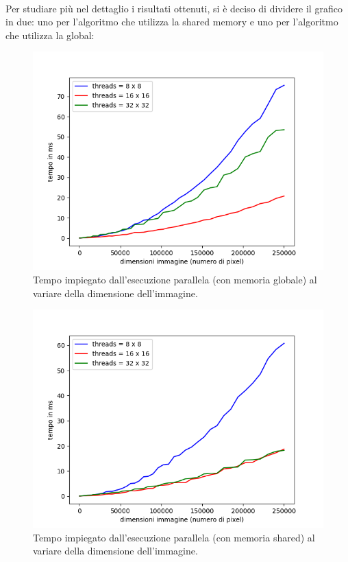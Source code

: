 \documentclass[10pt,twocolumn,letterpaper]{article}
\begin{document}
\\
Per studiare più nel dettaglio i risultati ottenuti, si è deciso di dividere il grafico in due: uno per l'algoritmo che utilizza la shared memory e uno per l'algoritmo che utilizza la global:
\begin{figure}[H]
\includegraphics[width=0.9\linewidth]{test/gridTest/mul32/global_result.png} 
\caption{\small Tempo impiegato dall'esecuzione parallela (con memoria globale) al variare della dimensione dell'immagine.}
\label{t2_1}
\end{figure}
\begin{figure}[H]
\includegraphics[width=0.9\linewidth]{test/gridTest/mul32/shared_result.png} 
\caption{\small Tempo impiegato dall'esecuzione parallela (con memoria shared) al variare della dimensione dell'immagine.}
\label{t2_2}
\end{figure}
\end{document}

